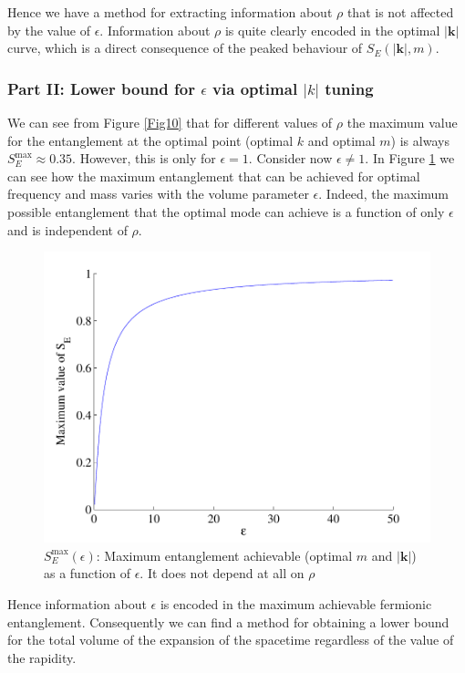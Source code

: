 Hence  we have a method for extracting information about $\rho$ that is not affected by the value of $\epsilon$.  Information about $\rho$ is quite clearly encoded in the optimal $|\bm k|$ curve, which is a direct consequence of the peaked behaviour of $S_E(|\bm k|,m)$.




\subsubsection{Part II: Lower bound for $\epsilon$ via optimal $|k|$ tuning}

We can see from Figure \ref{Fig10} that for different values of  $\rho$  the maximum value for the entanglement at the optimal point (optimal $k$ and optimal $m$)  is always $S_E^{\text{max}}\approx0.35$. However, this is only for $\epsilon=1$. Consider now $\epsilon\neq 1$. In Figure \ref{epsmax} we can see how the maximum entanglement that can be achieved for optimal frequency and mass varies with the volume parameter $\epsilon$. Indeed, the maximum possible entanglement that the optimal mode can achieve is a function of only $\epsilon$ and is independent of $\rho$.
\begin{figure}[h]
\begin{center}
\includegraphics[width=.89\textwidth]{maxepsil}
\end{center}
\caption{$S_E^{\text{max}}(\epsilon)$: Maximum entanglement achievable (optimal $m$ and $|\bm k|$) as a function of $\epsilon$. It does not depend at all on $\rho$}
\label{epsmax}
\end{figure}
Hence  information about $\epsilon$ is encoded in the maximum achievable fermionic entanglement. Consequently we can find a method for obtaining a lower bound for the total volume of the expansion of the spacetime regardless of the value of the rapidity. 

